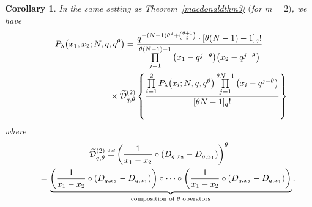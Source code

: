 \documentclass[pdftex]{sigma}
\numberwithin{equation}{section}
\newcommand\myeq{\mathrel{\stackrel{\makebox[0pt]{\mbox{\normalfont\tiny def}}}{=}}}
\newtheorem{cor}[thm]{Corollary}
\newcommand{\DD}{\mathcal{D}}
\begin{document}
\begin{cor}\label{macdonaldcor3}
In the same setting as Theorem~{\rm \ref{macdonaldthm3}} $($for $m = 2)$, we have
\begin{gather*}
P_{\lambda}\big(x_1, x_2; N, q, q^{\theta}\big) = \frac{q^{-(N-1)\theta^2 + {\theta + 1 \choose 2} } \cdot [\theta(N - 1) - 1]_q!}{\prod\limits_{j=1}^{\theta(N - 1) - 1}{\big(x_1 - q^{j-\theta}\big)\big(x_2 - q^{j-\theta}\big)}}\\
\hphantom{P_{\lambda}\big(x_1, x_2; N, q, q^{\theta}\big) = }{} \times\widetilde{\DD}_{q, \theta}^{(2)} \left\{ \frac{\prod\limits_{i=1}^2{ P_{\lambda}\big(x_i; N, q, q^{\theta}\big)\prod\limits_{j=1}^{\theta N-1}{\big(x_i - q^{j-\theta}\big)} } }{[\theta N - 1]_q!} \right\}
\end{gather*}
where
\begin{gather*}
\widetilde{\DD}_{q, \theta}^{(2)} \myeq \left( \frac{1}{x_1 - x_2} \circ (D_{q, x_2} - D_{q, x_1}) \right)^{\theta}\\
\hphantom{\widetilde{\DD}_{q, \theta}^{(2)} }{} = \underbrace{\left(\frac{1}{x_1 - x_2} \circ (D_{q, x_2} - D_{q, x_1})\right) \circ\cdots \circ \left(\frac{1}{x_1 - x_2} \circ (D_{q, x_2} - D_{q, x_1})\right)}_{\textrm{composition of $\theta$ operators}}.
\end{gather*}
\end{cor}
\end{document}
